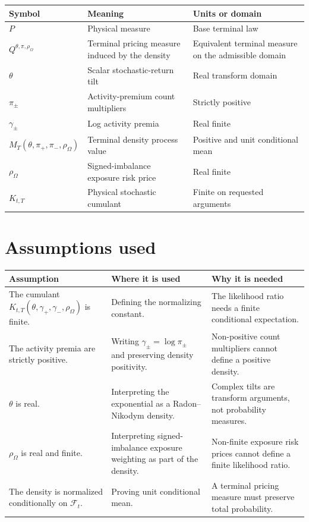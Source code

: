 \documentclass[11pt]{article}
\begin{document}
\begin{tabularx}{\textwidth}{lXX}
\toprule
Symbol & Meaning & Units or domain\\
\midrule
\(P\) & Physical measure & Base terminal law\\
\(Q^{\theta,\pi,\rho_\Omega}\) & Terminal pricing measure induced by the density & Equivalent terminal measure on the admissible domain\\
\(\theta\) & Scalar stochastic-return tilt & Real transform domain\\
\(\pi_\pm\) & Activity-premium count multipliers & Strictly positive\\
\(\gamma_\pm\) & Log activity premia & Real finite\\
\(M_T(\theta,\pi_+,\pi_-,\rho_\Omega)\) & Terminal density process value & Positive and unit conditional mean\\
\(\rho_\Omega\) & Signed-imbalance exposure risk price & Real finite\\
\(K_{t,T}\) & Physical stochastic cumulant & Finite on requested arguments\\
\bottomrule
\end{tabularx}

\section{Assumptions used}

\begin{tabularx}{\textwidth}{XXX}
\toprule
Assumption & Where it is used & Why it is needed\\
\midrule
The cumulant \(K_{t,T}(\theta,\gamma_+,\gamma_-,\rho_\Omega)\) is finite.
& Defining the normalizing constant.
& The likelihood ratio needs a finite conditional expectation.\\
The activity premia are strictly positive.
& Writing \(\gamma_\pm=\log\pi_\pm\) and preserving density positivity.
& Non-positive count multipliers cannot define a positive density.\\
\(\theta\) is real.
& Interpreting the exponential as a Radon--Nikodym density.
& Complex tilts are transform arguments, not probability measures.\\
\(\rho_\Omega\) is real and finite.
& Interpreting signed-imbalance exposure weighting as part of the density.
& Non-finite exposure risk prices cannot define a finite likelihood ratio.\\
The density is normalized conditionally on \(\mathcal F_t\).
& Proving unit conditional mean.
& A terminal pricing measure must preserve total probability.\\
\bottomrule
\end{tabularx}
\end{document}
